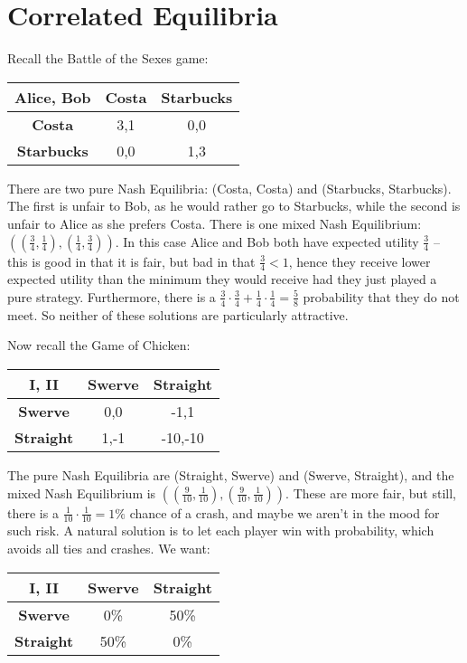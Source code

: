 \section{Correlated Equilibria}
Recall the Battle of the Sexes game:
\begin{center}
	\begin{tabular}{|c|c|c|}
		\hline
		\textbf{Alice, Bob} & \textbf{Costa} & \textbf{Starbucks} \\ \hline
		\textbf{Costa}      & 3,1            & 0,0 \\ \hline
		\textbf{Starbucks}  & 0,0            & 1,3 \\ \hline
	\end{tabular}
\end{center}

There are two pure Nash Equilibria: (Costa, Costa) and (Starbucks, Starbucks).
The first is unfair to Bob, as he would rather go to Starbucks, while the
second is unfair to Alice as she prefers Costa. There is one mixed Nash
Equilibrium: $((\frac{3}{4}, \frac{1}{4}), (\frac{1}{4}, \frac{3}{4}))$. In
this case Alice and Bob both have expected utility $\frac{3}{4}$ -- this is
good in that it is fair, but bad in that $\frac{3}{4} < 1$, hence they receive
lower expected utility than the minimum they would receive had they just played
a pure strategy. Furthermore, there is a $\frac{3}{4} \cdot \frac{3}{4} +
\frac{1}{4} \cdot \frac{1}{4} = \frac{5}{8}$ probability that they do not meet.
So neither of these solutions are particularly attractive.

Now recall the Game of Chicken:
\begin{center}
	\begin{tabular}{|c|c|c|}
		\hline
		\textbf{I, II}    & \textbf{Swerve} & \textbf{Straight} \\ \hline
		\textbf{Swerve}   & 0,0             & -1,1 \\ \hline
		\textbf{Straight} & 1,-1            & -10,-10 \\ \hline
	\end{tabular}
\end{center}

The pure Nash Equilibria are (Straight, Swerve) and (Swerve, Straight), and the
mixed Nash Equilibrium is $((\frac{9}{10}, \frac{1}{10}), (\frac{9}{10},
\frac{1}{10}))$. These are more fair, but still, there is a $\frac{1}{10} \cdot
\frac{1}{10} = 1\%$ chance of a crash, and maybe we aren't in the mood for such
risk.
A natural solution is to let each player win with probability, which avoids all
ties and crashes. We want:
\begin{center}
	\begin{tabular}{|c|c|c|}
		\hline
		\textbf{I, II}    & \textbf{Swerve} & \textbf{Straight} \\ \hline
		\textbf{Swerve}   & 0\% & 50\% \\ \hline
		\textbf{Straight} & 50\% & 0\% \\ \hline
	\end{tabular}
\end{center}

